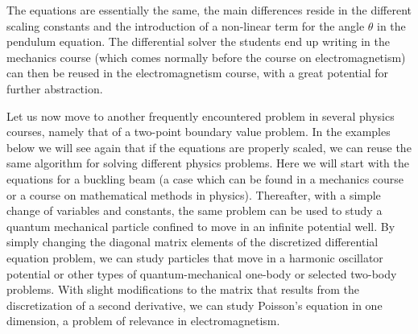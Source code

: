 \documentclass[graybox,envcountchap,sectrefs]{svmult}
\begin{document}
The equations are essentially the same, the main differences reside in
the different scaling constants and the introduction of a non-linear
term for the angle $\theta$ in the pendulum equation. The differential
solver the students end up writing in the mechanics course (which
comes normally before the course on electromagnetism) can then be
reused in the electromagnetism course, with a great potential for
further abstraction.

Let us now move to another frequently encountered problem in several
physics courses, namely that of a two-point boundary value problem. In
the examples below we will see again that if the equations are
properly scaled, we can reuse the same algorithm for solving different
physics problems. Here we will start with the equations for a buckling
beam (a case which can be found in a mechanics course or a course on
mathematical methods in physics). Thereafter, with a simple change of
variables and constants, the same problem can be used to study a
quantum mechanical particle confined to move in an infinite potential
well.  By simply changing the diagonal matrix elements of the
discretized differential equation problem, we can study particles that
move in a harmonic oscillator potential or other types of
quantum-mechanical one-body or selected two-body problems.  With
slight modifications to the matrix that results from the
discretization of a second derivative, we can study Poisson's equation
in one dimension, a problem of relevance in
electromagnetism.
\end{document}
